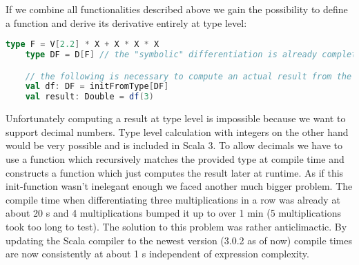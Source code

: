 If we combine all functionalities described above we gain the possibility to define a function and derive its derivative \todowording entirely at type level:
\begin{lstlisting}[language=scala]
    type F = V[2.2] * X + X * X * X
    type DF = D[F] // the "symbolic" differentiation is already completed here (at compile time)

    // the following is necessary to compute an actual result from the derivative (at runtime)
    val df: DF = initFromType[DF] 
    val result: Double = df(3)
\end{lstlisting}
Unfortunately computing a result at type level is impossible because we want to support decimal numbers. Type level calculation with integers on the other hand would be very possible and is included in Scala 3. To allow decimals we have to use a function  which recursively matches the provided type at compile time and constructs a function which just computes the result later at runtime. As if this init-function wasn't inelegant enough \todowording we faced another much bigger problem. The compile time when differentiating three multiplications in a row was already at about 20 s and 4 multiplications bumped it up to over 1 min (5 multiplications took too long to test). The solution to this problem was rather anticlimactic. By updating the Scala compiler to the newest version (3.0.2 as of now) compile times are now consistently at about 1 s independent of expression complexity.  
